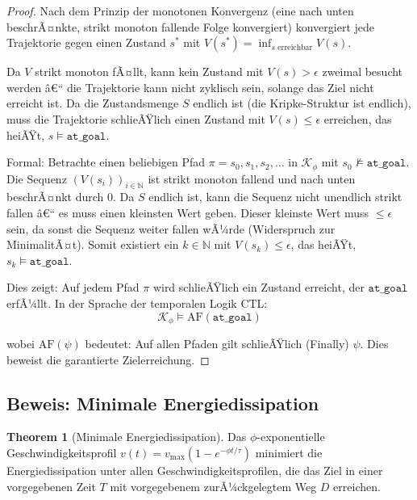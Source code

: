 ﻿\documentclass[a4paper,12pt]{article}
\theoremstyle{definition}
\newtheorem{theorem}{Theorem}[section]
\begin{document}
\begin{proof}
Nach dem Prinzip der monotonen Konvergenz (eine nach unten beschrÃ¤nkte, strikt monoton fallende Folge konvergiert) konvergiert jede Trajektorie gegen einen Zustand $s^*$ mit $V(s^*) = \inf_{s \text{ erreichbar}} V(s)$.

Da $V$ strikt monoton fÃ¤llt, kann kein Zustand mit $V(s) > \epsilon$ zweimal besucht werden â€“ die Trajektorie kann nicht zyklisch sein, solange das Ziel nicht erreicht ist. Da die Zustandsmenge $S$ endlich ist (die Kripke-Struktur ist endlich), muss die Trajektorie schlieÃŸlich einen Zustand mit $V(s) \leq \epsilon$ erreichen, das heiÃŸt, $s \models \texttt{at\_goal}$.

Formal: Betrachte einen beliebigen Pfad $\pi = s_0, s_1, s_2, \ldots$ in $\mathcal{K}_{\phi}$ mit $s_0 \not\models \texttt{at\_goal}$. Die Sequenz $(V(s_i))_{i \in \mathbb{N}}$ ist strikt monoton fallend und nach unten beschrÃ¤nkt durch 0. Da $S$ endlich ist, kann die Sequenz nicht unendlich strikt fallen â€“ es muss einen kleinsten Wert geben. Dieser kleinste Wert muss $\leq \epsilon$ sein, da sonst die Sequenz weiter fallen wÃ¼rde (Widerspruch zur MinimalitÃ¤t). Somit existiert ein $k \in \mathbb{N}$ mit $V(s_k) \leq \epsilon$, das heiÃŸt, $s_k \models \texttt{at\_goal}$.

Dies zeigt: Auf jedem Pfad $\pi$ wird schlieÃŸlich ein Zustand erreicht, der $\texttt{at\_goal}$ erfÃ¼llt. In der Sprache der temporalen Logik CTL:
\begin{equation}
\mathcal{K}_{\phi} \models \text{AF}(\texttt{at\_goal})
\end{equation}

wobei $\text{AF}(\psi)$ bedeutet: Auf allen Pfaden gilt schlieÃŸlich (Finally) $\psi$. Dies beweist die garantierte Zielerreichung.
\end{proof}

\subsection{Beweis: Minimale Energiedissipation}

\begin{theorem}[Minimale Energiedissipation]
Das $\phi$-exponentielle Geschwindigkeitsprofil $v(t) = v_{\max}(1 - e^{-\phi t/\tau})$ minimiert die Energiedissipation unter allen Geschwindigkeitsprofilen, die das Ziel in einer vorgegebenen Zeit $T$ mit vorgegebenem zurÃ¼ckgelegtem Weg $D$ erreichen.
\end{theorem}
\end{document}
